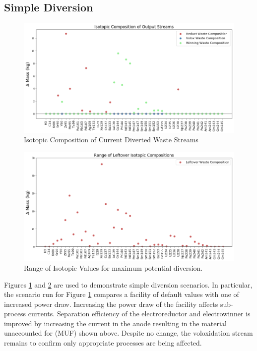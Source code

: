 \subsection{Simple Diversion}
\begin{figure} [h]
	\includegraphics[width=\linewidth]{images/current-isotope-comp}
	\caption{Isotopic Composition of Current Diverted Waste Streams}
	\label{fig:current-isotope-comp}
\end{figure}

\begin{figure} [h]
	\includegraphics[width=\linewidth]{images/isotopic-comp-range}
	\caption{Range of Isotopic Values for maximum potential diversion.}
	\label{fig:isotopic-range}
\end{figure}

Figures \ref{fig:current-isotope-comp} and \ref{fig:isotopic-range} are used to demonstrate simple diversion scenarios. In particular, the scenario run for Figure
\ref{fig:current-isotope-comp} compares a facility of default values with one of increased power draw. Increasing the power draw of the facility affects sub-process currents.
Separation efficiency of the electroreductor and electrowinner is improved by increasing the current in the anode resulting in the material unaccounted for (MUF) shown above. Despite no change, the voloxidation stream
remains to confirm only appropriate processes are being affected. 

